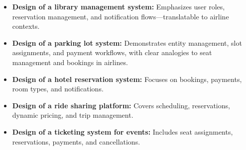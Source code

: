 \begin{itemize}
\item
\protect{}\label{rZGFwAeacIuG5DqqgdOoy}
\textbf{Design of a library management system:} Emphasizes user roles, reservation management, and notification flows---translatable to airline contexts.
\item
\protect{}\label{qRrbeAS2Mv6kc05MPRjvK}
\textbf{Design of a parking lot system:} Demonstrates entity management, slot assignments, and payment workflows, with clear analogies to seat management and bookings in airlines.
\item
\protect{}\label{L0Yh_sW9mBw5l_bPi4fWD}
\textbf{Design of a hotel reservation system:} Focuses on bookings, payments, room types, and notifications.
\item
\protect{}\label{PhVQzhiSfBwn3Ds8heOxO}
\textbf{Design of a ride sharing platform:} Covers scheduling, reservations, dynamic pricing, and trip management.
\item
\protect{}\label{Kfk-BIwhoCN0KpyMHGIVV}
\textbf{Design of a ticketing system for events:} Includes seat assignments, reservations, payments, and cancellations.
\end{itemize}


